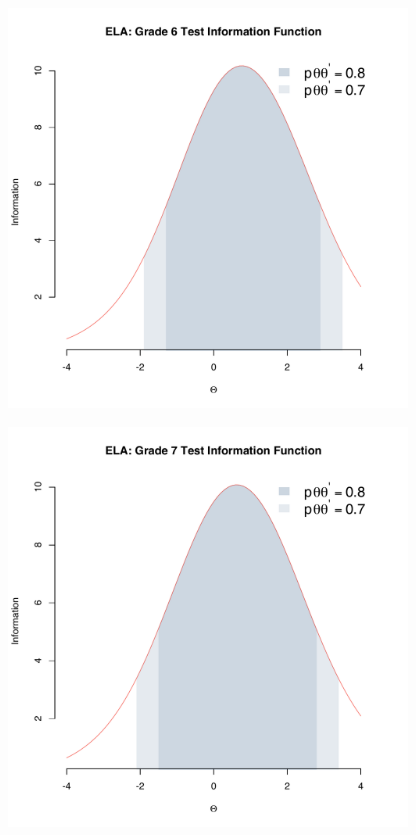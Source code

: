 \documentclass[]{article}
\begin{document}
\begin{figure}
\centering
\includegraphics[height=4.16667in]{tifs/ela6tif.pdf}
\caption{}
\end{figure}

\begin{figure}
\centering
\includegraphics[height=4.16667in]{tifs/ela7tif.pdf}
\caption{}
\end{figure}
\end{document}

